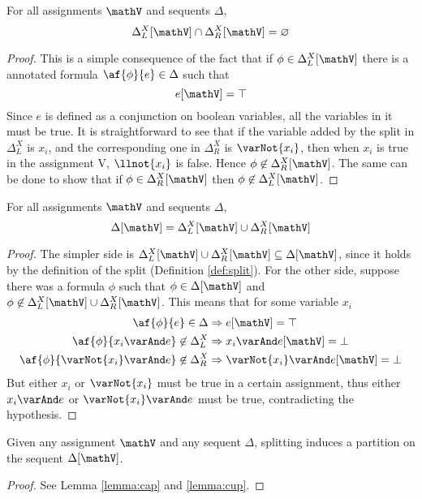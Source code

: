 \begin{lemma}
	\label{lemma:cap}
	For all assignments $\mathV$ and sequents $\Delta$,
	$$ \Delta_L^X[\mathV] \cap \Delta_R^X[\mathV] = \varnothing $$
\end{lemma}
\begin{proof}
	This is a simple consequence of the fact that if $\phi \in \Delta_L^X[\mathV]$ there is a annotated formula $\af{\phi}{e} \in \Delta$ such that 
	$$ e[\mathV] = \top $$
	Since $e$ is defined as a conjunction on boolean variables, all the variables in it must be true.
	It is straightforward to see that if the variable added by the split in $\Delta_L^X$ is $x_i$, and the corresponding one in $\Delta_R^X$ is $\varNot{x_i}$, then when $x_i$ is true in the assignment V, $\llnot{x_i}$ is false.
	Hence $\phi \not \in \Delta_R^X[\mathV]$.
	The same can be done to show that if $\phi \in \Delta_R^X[\mathV]$ then $\phi \not \in \Delta_L^X[\mathV]$.
\end{proof}
\begin{lemma}
	\label{lemma:cup}
	For all assignments $\mathV$ and sequents $\Delta$,
	$$ \Delta[\mathV] = \Delta_L^X[\mathV] \cup \Delta_R^X[\mathV] $$
\end{lemma}
\begin{proof}
	The simpler side is $\Delta_L^X[\mathV] \cup \Delta_R^X[\mathV] \subseteq \Delta[\mathV]$, since it  holds by the definition of the split (Definition \ref{def:split}).
	For the other side, suppose there was a formula $\phi$ such that $\phi \in \Delta[\mathV]$ and $\phi \not \in \Delta_L^X[\mathV] \cup \Delta_R^X[\mathV]$.
	This means that for some variable $x_i$ 
	\begin{align*}
		\af{\phi}{e} \in \Delta &\Rightarrow e[\mathV] = \top \\
		\af{\phi}{x_i \varAnd e} \not \in \Delta_L^X &\Rightarrow x_i \varAnd e[\mathV] = \bot \\
		\af{\phi}{\varNot{x_i} \varAnd e} \not \in \Delta_R^X &\Rightarrow \varNot{x_i} \varAnd e[\mathV] = \bot
	\end{align*}
	But either $x_i$ or $\varNot{x_i}$ must be true in a certain assignment, thus either $x_i \varAnd e$ or $\varNot{x_i} \varAnd e$ must be true, contradicting the hypothesis.
\end{proof}
\begin{lemma}
	Given any assignment $\mathV$ and any sequent $\Delta$, splitting induces a partition on the sequent $\Delta[\mathV]$.
\end{lemma}
\begin{proof}
	See Lemma \ref{lemma:cap} and \ref{lemma:cup}.
\end{proof}

